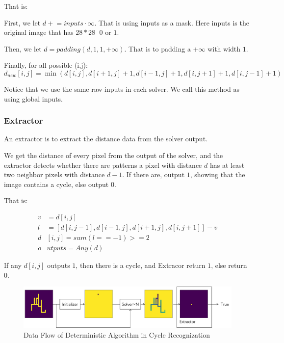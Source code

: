\documentclass{article}
\begin{document}
That is: 

First, we let $d \mathrel{+}= inputs \cdot \infty$. That is using inputs as a mask. Here inputs is the original image that has $28*28\;$ $0$ or $1$. 

Then, we let $d = padding(d, 1, 1, +\infty)$. That is to padding a $+\infty$ with width $1$.

Finally, for all possible (i,j): 
$$d_{new}[i,j] = \min(d[i,j], d[i+1, j] + 1, d[i-1, j] + 1, d[i, j+1] + 1, d[i, j-1] + 1)$$

Notice that we use the same raw inputs in each solver. We call this method as using global inputs.


\subsubsection{Extractor}

An extractor is to extract the distance data from the solver output. 

We get the distance of every pixel from the output of the solver, 
and the extractor detects whether there are patterns a pixel with distance $d$ has at least two neighbor pixels with distance $d-1$.
If there are, output $1$, showing that the image contains a cycle, else output $0$.

That is:

\begin{align*}
    v& = d[i,j]                                       \\
    l& = [d[i,j-1], d[i-1,j], d[i+1,j], d[i,j+1]] - v \\
    d&[i,j] = sum(l == -1) >= 2 \\
    o&utputs = Any(d)
\end{align*}

If any $d[i,j]$ outputs $1$, then there is a cycle, and Extracor return $1$, else return $0$.

\begin{figure}[H] %
\centering %
\includegraphics[width=1.0\textwidth]{../image/flow.png} %
\caption{Data Flow of Deterministic Algorithm in Cycle Recognization} %
\label{Fig.Flow} %
\end{figure}
\end{document}
